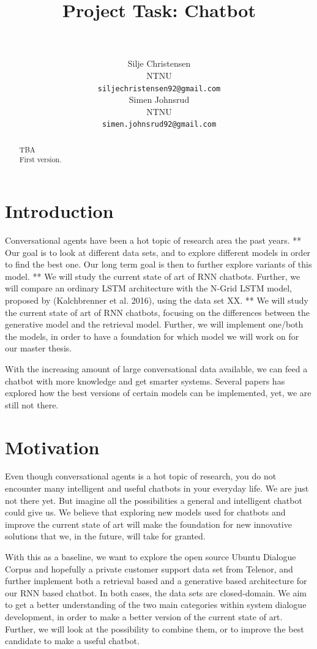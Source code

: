 \documentclass{article} %
\title{Project Task: Chatbot}
\author{
 \\
\texttt{} \\
\AND
Silje Christensen \\
NTNU \\
\texttt{siljechristensen92@gmail.com} \\
\And
Simen Johnsrud \\
NTNU \\
\texttt{simen.johnsrud92@gmail.com} \\
}
\begin{document}
\maketitle

\begin{abstract}
TBA\\
First version.
\end{abstract}

\section{Introduction}
Conversational agents have been a hot topic of research area the past years. 
**
Our goal is to look at different data sets, and to explore different models in order to find the best one. Our long term goal is then to further explore variants of this model. 
**
We will study the current state of art of RNN chatbots. Further, we will compare an ordinary LSTM architecture with the N-Grid LSTM model, proposed by (Kalchbrenner et al. 2016), using the data set XX. 
**
We will study the current state of art of RNN chatbots, focusing on the differences between the generative model and the retrieval model. Further, we will implement one/both the models, in order to have a foundation for which model we will work on for our master thesis. 

With the increasing amount of large conversational data available, we can feed a chatbot with more knowledge and get smarter systems. Several papers has explored how the best versions of certain models can be implemented, yet, we are still not there. 

\section{Motivation}
Even though conversational agents is a hot topic of research, you do not encounter many intelligent and useful chatbots in your everyday life. We are just not there yet. But imagine all the possibilities a general and intelligent chatbot could give us. We believe that exploring new models used for chatbots and improve the current state of art will make the foundation for new innovative solutions that we, in the future, will take for granted. 

With this as a baseline, we want to explore the open source Ubuntu Dialogue Corpus and hopefully a private customer support data set from Telenor, and further implement both a retrieval based and a generative based architecture for our RNN based chatbot. In both cases, the data sets are closed-domain. We aim to get a better understanding of the two main categories within system dialogue development, in order to make a better version of the current state of art. Further, we will look at the possibility to combine them, or to improve the best candidate to make a useful chatbot. 
\end{document}
